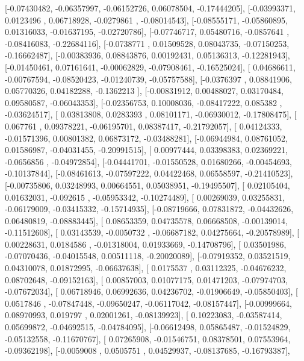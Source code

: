 \documentclass{article}
\begin{document}
       [-0.07430482, -0.06357997, -0.06152726,  0.06078504, -0.17444205],
       [-0.03993371,  0.0123496 ,  0.06718928, -0.0279861 , -0.08014543],
       [-0.08555171, -0.05860895,  0.01316033, -0.01637195, -0.02720786],
       [-0.07746717,  0.05480716, -0.0857641 , -0.08416083, -0.22684116],
       [-0.0738771 ,  0.01509528,  0.08043735, -0.07150253, -0.16662487],
       [-0.00383936,  0.08843876,  0.00192431,  0.05136313, -0.12281943],
       [-0.01450461,  0.07161641, -0.00062829, -0.07908461, -0.16525024],
       [ 0.04686611, -0.00767594, -0.08520423, -0.01240739, -0.05757588],
       [-0.0376397 ,  0.08841906,  0.05770326,  0.04182288, -0.1362213 ],
       [-0.00831912,  0.00488027,  0.03170484,  0.09580587, -0.06043353],
       [-0.02356753,  0.10008036, -0.08417222,  0.085382  , -0.03624517],
       [ 0.03813808,  0.0283393 ,  0.08101171, -0.06930012, -0.17808475],
       [ 0.067761  ,  0.09378221, -0.06195701,  0.08387417, -0.21792057],
       [ 0.04124333, -0.01571396,  0.00801382,  0.06873172, -0.03488281],
       [-0.06944984,  0.08761052,  0.01586987, -0.04031455, -0.20991515],
       [ 0.00977444,  0.03398383,  0.02369221, -0.0656856 , -0.04972854],
       [-0.04441701, -0.01550528,  0.01680266, -0.00454693, -0.10137844],
       [-0.08461613, -0.07597222,  0.04422468,  0.06558597, -0.21410523],
       [-0.00735806,  0.03248993,  0.00664551,  0.05038951, -0.19495507],
       [ 0.02105404,  0.01632031, -0.092615  , -0.05953342, -0.10274489],
       [ 0.00269039,  0.03255831, -0.06179009, -0.03415332, -0.15714935],
       [-0.08719666,  0.07831872, -0.04432626,  0.06480819, -0.08883445],
       [ 0.08653359,  0.04735578,  0.06668508, -0.00139014, -0.11512608],
       [ 0.03143539, -0.0050732 , -0.06687182,  0.04275664, -0.20578989],
       [ 0.00228631,  0.0184586 , -0.01318004,  0.01933669, -0.14708796],
       [ 0.03501986, -0.07070436, -0.04015548,  0.00511118, -0.20020089],
       [-0.07919352,  0.03521519,  0.04310078,  0.01872995, -0.06637638],
       [ 0.0175537 ,  0.03112325, -0.04676232,  0.08702648, -0.09152163],
       [ 0.00857003,  0.01077175,  0.01471203, -0.07974703, -0.07672034],
       [ 0.06718946,  0.06992636,  0.04236702, -0.01906649, -0.05850403],
       [ 0.0517846 , -0.07847448, -0.09650247, -0.06117042, -0.08157447],
       [-0.00999664,  0.08970993,  0.019797  ,  0.02001261, -0.08139923],
       [ 0.10223083, -0.03587414,  0.05699872, -0.04692515, -0.04784095],
       [-0.06612498,  0.05865487, -0.01524829, -0.05132558, -0.11670767],
       [ 0.07265908, -0.01546751,  0.08378501,  0.07553964, -0.09362198],
       [-0.0059008 ,  0.0505751 ,  0.04529937, -0.08137685, -0.16793387],
\end{document}
